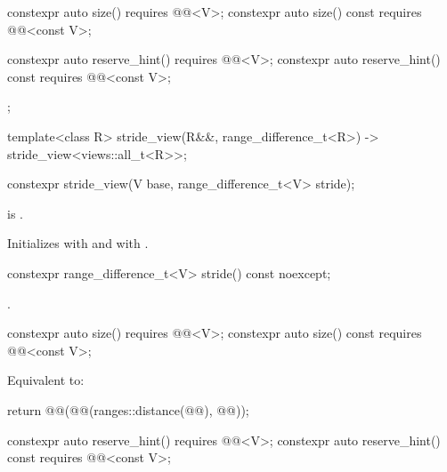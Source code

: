 \begin{codeblock}
{{    constexpr auto size() requires @@<V>;
    constexpr auto size() const requires @@<const V>;

    constexpr auto reserve_hint() requires @@<V>;
    constexpr auto reserve_hint() const requires @@<const V>;
  };

  template<class R>
    stride_view(R&&, range_difference_t<R>) -> stride_view<views::all_t<R>>;
}
\end{codeblock}

%
\begin{itemdecl}
constexpr stride_view(V base, range_difference_t<V> stride);
\end{itemdecl}

\begin{itemdescr}
\pnum
\expects
{} is .

\pnum
\effects
Initializes  with  and
 with .
\end{itemdescr}

%
\begin{itemdecl}
constexpr range_difference_t<V> stride() const noexcept;
\end{itemdecl}

\begin{itemdescr}
\pnum
\returns
{}.
\end{itemdescr}

%
\begin{itemdecl}
constexpr auto size() requires @@<V>;
constexpr auto size() const requires @@<const V>;
\end{itemdecl}

\begin{itemdescr}
\pnum
\effects
Equivalent to:
\begin{codeblock}
return @@(@@(ranges::distance(@@), @@));
\end{codeblock}
\end{itemdescr}

%
\begin{itemdecl}
constexpr auto reserve_hint() requires @@<V>;
constexpr auto reserve_hint() const requires @@<const V>;
\end{itemdecl}

